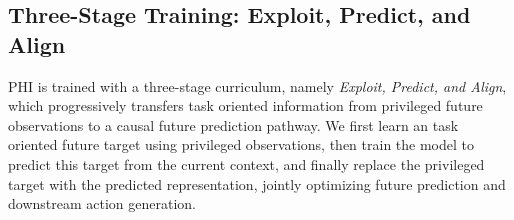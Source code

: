 \documentclass{article} %
\begin{document}



\subsection{Three-Stage Training: Exploit, Predict, and Align}

PHI is trained with a three-stage curriculum, namely \textit{Exploit,
Predict, and Align}, which progressively transfers task oriented
information from privileged future observations to a causal future
prediction pathway. We first learn an task oriented future target using
privileged observations, then train the model to predict this target from
the current context, and finally replace the privileged target with the predicted representation, jointly optimizing future prediction and downstream action generation.
\end{document}
